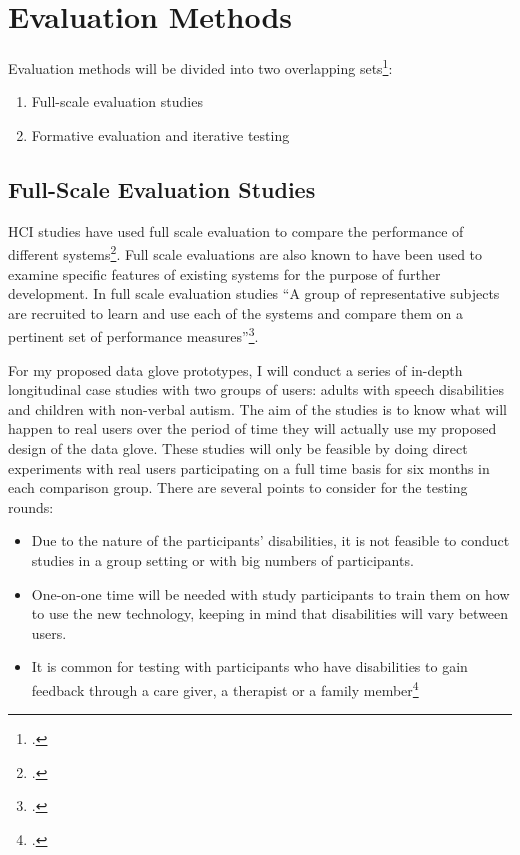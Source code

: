 \chapter{Evaluation Methods}

Evaluation methods will be divided into two overlapping sets\footcite{Fallman2005}:

\begin{enumerate}
    \item Full-scale evaluation studies
    \item Formative evaluation and iterative testing
\end{enumerate}

\section{Full-Scale Evaluation Studies} 

HCI studies have used full scale evaluation to compare the performance of different systems\footcite{Wania2006}. Full scale evaluations are also known to have been used to examine specific features of existing systems for the purpose of further development. In full scale evaluation studies  ``A group of representative subjects are recruited to learn and use each of the systems and compare them on a pertinent set of performance measures''\footcite{Cox2008}.

For my proposed data glove prototypes, I will conduct a series of in-depth longitudinal case studies with two groups of users: adults with speech disabilities and children with non-verbal autism. The aim of the studies is to know what will happen to real users over the period of time they will actually use my proposed design of the data glove. These studies will only be feasible by doing direct experiments with real users participating on a full time basis for six months in each comparison group. There are several points to consider for the testing rounds:

\begin{itemize}
    \item Due to the nature of the participants' disabilities, it is not feasible to conduct studies in a group setting or with big numbers of participants.
    \item One-on-one time will be needed with study participants to train them on how to use the new technology, keeping in mind that disabilities will vary between users. 
    \item It is common for testing with participants who have disabilities to gain feedback through a care giver, a therapist or a family member\footcite{Lazar2010}
\end{itemize}

